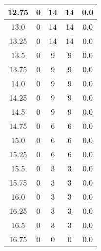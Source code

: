 \documentclass[letterpaper, 12pt]{article}
\begin{document}
\begin{longtable}{|c|c|c|c|c|}
\hline
12.75 & 0 & 14 & 14 & 0.0 \\
\hline
13.0 & 0 & 14 & 14 & 0.0 \\
\hline
13.25 & 0 & 14 & 14 & 0.0 \\
\hline
13.5 & 0 & 9 & 9 & 0.0 \\
\hline
13.75 & 0 & 9 & 9 & 0.0 \\
\hline
14.0 & 0 & 9 & 9 & 0.0 \\
\hline
14.25 & 0 & 9 & 9 & 0.0 \\
\hline
14.5 & 0 & 9 & 9 & 0.0 \\
\hline
14.75 & 0 & 6 & 6 & 0.0 \\
\hline
15.0 & 0 & 6 & 6 & 0.0 \\
\hline
15.25 & 0 & 6 & 6 & 0.0 \\
\hline
15.5 & 0 & 3 & 3 & 0.0 \\
\hline
15.75 & 0 & 3 & 3 & 0.0 \\
\hline
16.0 & 0 & 3 & 3 & 0.0 \\
\hline
16.25 & 0 & 3 & 3 & 0.0 \\
\hline
16.5 & 0 & 3 & 3 & 0.0 \\
\hline
16.75 & 0 & 0 & 0 & 0.0 \\
\hline
\end{longtable}
\end{document}
